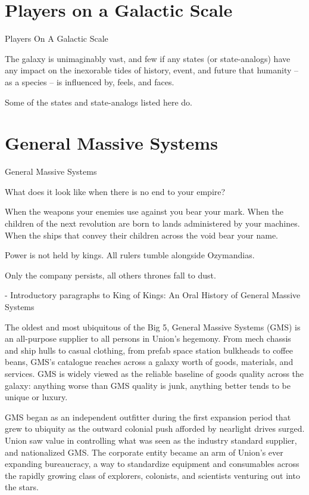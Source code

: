 \chapter{Players on a Galactic Scale}

Players On A Galactic Scale

The galaxy is unimaginably vast, and few if any states (or state-analogs) have any
impact on the inexorable tides of history, event, and future that humanity -- as a species -- is
influenced by, feels, and faces.

Some of the states and state-analogs listed here do.
\chapter{General Massive Systems}
General Massive Systems

         What does it look like when there is no end to your empire?

         When the weapons your enemies use against you bear your mark. When the children of
         the next revolution are born to lands administered by your machines. When the ships that
         convey their children across the void bear your name.

         Power is not held by kings. All rulers tumble alongside Ozymandias.

         Only the company persists, all others thrones fall to dust.

             -   Introductory paragraphs to King of Kings: An Oral History of General Massive
                 Systems

The oldest and most ubiquitous of the Big 5, General Massive Systems (GMS) is an all-purpose
supplier to all persons in Union’s hegemony. From mech chassis and ship hulls to casual clothing,
from prefab space station bulkheads to coffee beans, GMS’s catalogue reaches across a galaxy
worth of goods, materials, and services. GMS is widely viewed as the reliable baseline of goods
quality across the galaxy: anything worse than GMS quality is junk, anything better tends to be
unique or luxury.

GMS began as an independent outfitter during the first expansion period that grew to ubiquity as
the outward colonial push afforded by nearlight drives surged. Union saw value in controlling what
was seen as the industry standard supplier, and nationalized GMS. The corporate entity became
an arm of Union’s ever expanding bureaucracy, a way to standardize equipment and
consumables across the rapidly growing class of explorers, colonists, and scientists venturing out
into the stars.

